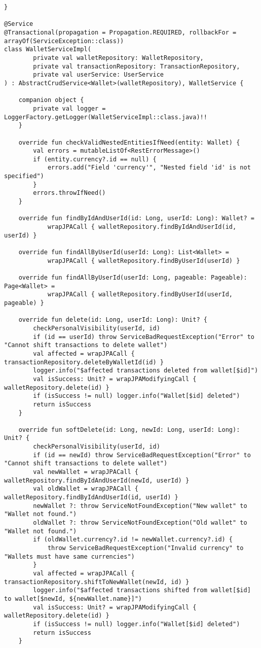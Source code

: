 \begin{lstlisting}[style = ktstyle]
}

@Service
@Transactional(propagation = Propagation.REQUIRED, rollbackFor = arrayOf(ServiceException::class))
class WalletServiceImpl(
        private val walletRepository: WalletRepository,
        private val transactionRepository: TransactionRepository,
        private val userService: UserService
) : AbstractCrudService<Wallet>(walletRepository), WalletService {

    companion object {
        private val logger = LoggerFactory.getLogger(WalletServiceImpl::class.java)!!
    }

    override fun checkValidNestedEntitiesIfNeed(entity: Wallet) {
        val errors = mutableListOf<RestErrorMessage>()
        if (entity.currency?.id == null) {
            errors.add("Field 'currency'", "Nested field 'id' is not specified")
        }
        errors.throwIfNeed()
    }

    override fun findByIdAndUserId(id: Long, userId: Long): Wallet? =
            wrapJPACall { walletRepository.findByIdAndUserId(id, userId) }

    override fun findAllByUserId(userId: Long): List<Wallet> =
            wrapJPACall { walletRepository.findByUserId(userId) }

    override fun findAllByUserId(userId: Long, pageable: Pageable): Page<Wallet> =
            wrapJPACall { walletRepository.findByUserId(userId, pageable) }

    override fun delete(id: Long, userId: Long): Unit? {
        checkPersonalVisibility(userId, id)
        if (id == userId) throw ServiceBadRequestException("Error" to "Cannot shift transactions to delete wallet")
        val affected = wrapJPACall { transactionRepository.deleteByWalletId(id) }
        logger.info("$affected transactions deleted from wallet[$id]")
        val isSuccess: Unit? = wrapJPAModifyingCall { walletRepository.delete(id) }
        if (isSuccess != null) logger.info("Wallet[$id] deleted")
        return isSuccess
    }

    override fun softDelete(id: Long, newId: Long, userId: Long): Unit? {
        checkPersonalVisibility(userId, id)
        if (id == newId) throw ServiceBadRequestException("Error" to "Cannot shift transactions to delete wallet")
        val newWallet = wrapJPACall { walletRepository.findByIdAndUserId(newId, userId) }
        val oldWallet = wrapJPACall { walletRepository.findByIdAndUserId(id, userId) }
        newWallet ?: throw ServiceNotFoundException("New wallet" to "Wallet not found.")
        oldWallet ?: throw ServiceNotFoundException("Old wallet" to "Wallet not found.")
        if (oldWallet.currency?.id != newWallet.currency?.id) {
            throw ServiceBadRequestException("Invalid currency" to "Wallets must have same currencies")
        }
        val affected = wrapJPACall { transactionRepository.shiftToNewWallet(newId, id) }
        logger.info("$affected transactions shifted from wallet[$id] to wallet[$newId, ${newWallet.name}]")
        val isSuccess: Unit? = wrapJPAModifyingCall { walletRepository.delete(id) }
        if (isSuccess != null) logger.info("Wallet[$id] deleted")
        return isSuccess
    }


\end{lstlisting}
